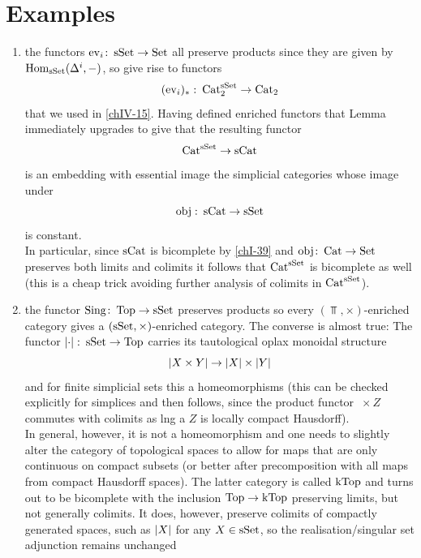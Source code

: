    \section{Examples}
        \begin{enumerate}[label=\roman*)]
            \item 
                the functors $\operatorname{ev}_i \colon \operatorname{sSet} \to \operatorname{Set}$ all preserve products since they are given by \\
                $\operatorname{Hom}_{\operatorname{sSet}}(\Delta^i, -)$, so give rise to functors
                \begin{equation*}
                    (\operatorname{ev}_i)_{*} \,\colon \operatorname{Cat}^{\operatorname{sSet}}_2 \to \operatorname{Cat}_2
                \end{equation*}
                that we used in \ref{chIV-15}. Having defined enriched functors that Lemma immediately upgrades to give that the resulting functor
                \begin{equation*}
                    \operatorname{Cat}^{\operatorname{sSet}} \to \operatorname{sCat}
                \end{equation*}
                is an embedding with essential image the simplicial categories whose image under
                \begin{equation*}
                    \operatorname{obj} \,\colon \operatorname{sCat} \to \operatorname{sSet}
                \end{equation*}
                is constant.\\
                In particular, since $\operatorname{sCat}$ is bicomplete by \ref{chI-39} and $\operatorname{obj} \colon \operatorname{Cat} \to \operatorname{Set}$ preserves both limits and colimits it follows that $\operatorname{Cat}^{\operatorname{sSet}}$ is bicomplete as well (this is a cheap trick avoiding further analysis of colimits in $\operatorname{Cat}^{\operatorname{sSet}}$).
            \item 
                the functor $\operatorname{Sing} \colon \operatorname{Top} \to \operatorname{sSet}$ preserves products so every $(\Top, \times)$-enriched category gives a $(\operatorname{sSet}, \times)$-enriched category. The converse is almost true: The functor $\left| \cdot \right| \colon \operatorname{sSet} \to \operatorname{Top}$ carries its tautological oplax monoidal structure
                \begin{equation*}
                    \left| X \times Y \right| \to \left| X \right| \times \left| Y \right|
                \end{equation*}
                and for finite simplicial sets this a homeomorphisms (this can be checked explicitly for simplices and then follows, since the product functor $\ \times Z$ commutes with colimits as lng a $Z$ is locally compact Hausdorff). \\
                In general, however, it is not a homeomorphism and one needs to slightly alter the category of topological spaces to allow for maps that are only continuous on compact subsets (or better after precomposition with all maps from compact Hausdorff spaces). The latter category is called $\operatorname{kTop}$ and turns out to be bicomplete with the inclusion $\operatorname{Top} \to \operatorname{kTop}$ preserving limits, but not generally colimits. It does, however, preserve colimits of compactly generated spaces, such as $\left| X \right|$ for any $X \in \operatorname{sSet}$, so the realisation/singular set adjunction remains unchanged

\end{enumerate}
